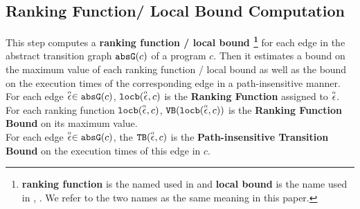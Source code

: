 \subsection{Ranking Function/ Local Bound Computation}
\label{sec:ranking}
This step computes a 
\textbf{ranking function / local bound
\footnote{\textbf{ranking function} is the named used in \cite{SinnZV14}
and \textbf{local bound} is the name used in \cite{ZulegerGSV11}, \cite{sinn2017complexity}.
We refer to the two names as the same meaning in this paper.}}
for each edge in the abstract transition graph $\mathtt{abs}{\mathtt{G}}(c)$ of a program $c$.
Then it estimates a bound on the maximum value of each ranking function / local bound as well as
the bound on the execution times of the corresponding edge in a path-insensitive manner.
\\
For each edge $\stackrel{\scriptscriptstyle{\alpha}}{\mathtt{\epsilon}{}} \in \mathtt{abs}{\mathtt{G}}(c)$,
$\mathtt{locb}(\stackrel{\scriptscriptstyle{\alpha}}{\mathtt{\epsilon}{}}, c)$ is the \textbf{Ranking Function} assigned to $\stackrel{\scriptscriptstyle{\alpha}}{\mathtt{\epsilon}{}}$.
\\
For each ranking function $\mathtt{locb}(\stackrel{\scriptscriptstyle{\alpha}}{\mathtt{\epsilon}{}}, c)$, ${\mathtt{VB}}(\mathtt{locb}(\stackrel{\scriptscriptstyle{\alpha}}{\mathtt{\epsilon}{}}, c))$ is
the \textbf{Ranking Function Bound} on its maximum value.
\\
For each edge $\stackrel{\scriptscriptstyle{\alpha}}{\mathtt{\epsilon}{}} \in \mathtt{abs}{\mathtt{G}}(c)$, the ${\mathtt{TB}}(\stackrel{\scriptscriptstyle{\alpha}}{\mathtt{\epsilon}{}}, c)$ is the \textbf{Path-insensitive Transition Bound}
on the execution times of this edge in $c$.
